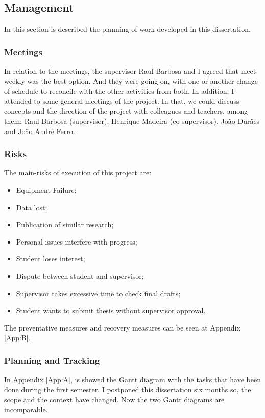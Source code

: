 \subsection{Management}

In this section is described the planning of work developed in this dissertation.

\subsubsection{Meetings}
In relation to the meetings, the supervisor Raul Barbosa and I agreed that meet weekly was the best option. And they were going on, with one or another change of schedule to reconcile with the other activities from both. In addition, I attended to some general meetings of the project. In that, we could discuss concepts and the direction of the project with colleagues and teachers, among them: Raul Barbosa (supervisor), Henrique Madeira (co-supervisor), João Durães and João André Ferro.

\subsubsection{Risks}

The main-risks of execution of this project are:


\begin{itemize}
	\item Equipment Failure;
	\item Data lost;
	\item Publication of similar research;
	\item Personal issues interfere with progress;
	\item Student loses interest;
	\item Dispute between student and supervisor;
	\item Supervisor takes excessive time to check final drafts;
	\item Student wants to submit thesis without supervisor approval.
\end{itemize}


The preventative measures and recovery measures can be seen at Appendix \ref{App:B}.

\subsubsection{Planning and Tracking}
In Appendix \ref{App:A}, is showed the Gantt diagram with the tasks that have been done during the first semester.
I postponed this dissertation six months so, the scope and the context have changed. Now the two Gantt diagrams are incomparable.


